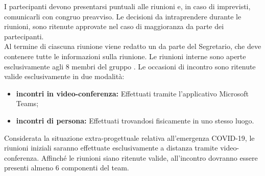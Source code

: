 			I partecipanti devono presentarsi puntuali alle riunioni e, in caso di imprevisti, comunicarli con congruo preavviso.
			Le decisioni da intraprendere durante le riunioni, sono ritenute approvate nel caso di maggioranza da parte dei partecipanti.\\
			Al termine di ciascuna riunione viene redatto un \Verbale{} da parte del Segretario, che deve contenere tutte le informazioni sulla riunione.
				Le riunioni interne sono aperte esclusivamente agli 8 membri del gruppo \Gruppo{}. Le occasioni di incontro sono ritenute valide esclusivamente in due modalità:
				\begin{itemize}
					\item \textbf{incontri in video-conferenza:} Effettuati tramite l'applicativo Microsoft Teams;
					\item \textbf{incontri di persona:} Effettuati trovandosi fisicamente in uno stesso luogo.
				\end{itemize}
				Considerata la situazione extra-progettuale relativa all'emergenza COVID-19, le riunioni iniziali saranno effettuate esclusivamente a distanza tramite video-conferenza.
				Affinché le riunioni siano ritenute valide, all'incontro dovranno essere presenti almeno 6 componenti del team.
			
